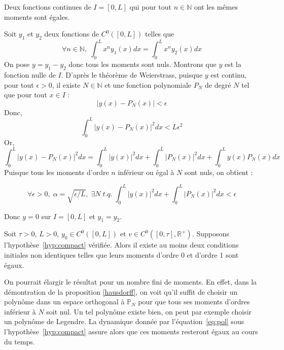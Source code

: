 \documentclass[a4paper]{article}
\begin{document}
\begin{proposition}
	\label{hausdorff}
	Deux fonctions continues de $I=[0,L]$ qui pour tout $n \in \mathbb{N}$ ont les mêmes moments sont égales. 
\end{proposition}

\begin{preuve}
	Soit $y_1$ et $y_2$ deux fonctions de $C^0([0,L])$ telles que 
	\[\forall n \in \mathbb{N}, \; \int_0^L x^n y_1(x)dx = \int_0^L x^n y_2(x)dx \]
	On pose $y=y_1 - y_2$ donc tous les moments sont nuls. Montrons que $y$ est la fonction nulle de $I$.
	D'après le théorème de Weierstrass, puisque $y$ est continu, pour tout $\epsilon>0$, il existe $N \in \mathbb{N}$ et une fonction polynomiale $P_N$ de degré $N$ tel que pour tout $x \in I$ :
	\[ |y(x) - P_N(x)| < \epsilon \]
	Donc,
	\[ \int_0^L |y(x) - P_N(x)|^2 dx < L \epsilon^2 \]
	Or,
	\[ \int_0^L |y(x) - P_N(x)|^2 dx = \int_0^L |y(x)|^2 dx  + \int_0^L |P_N(x)|^2 dx 
	                                   + \int_0^L y(x)P_N(x)dx \]
 Puisque tous les moments d'ordre $n$ inférieur ou égal à $N$ sont nuls, on obtient :
 
 \[ \forall \epsilon>0, \; \alpha = \sqrt{\epsilon/L}  , \; \exists N \; t.q. \; \int_0^L |y(x)|^2 dx  + \int_0^L |P_N(x)|^2 dx <\epsilon \]
 
 Donc $y =0$ sur $I=[0,L]$ et $y_1=y_2$.

\end{preuve}

\begin{proposition}
	Soit $\tau >0$, $L>0$, $y_0 \in C^0([0,L])$ et $v \in C^0([0,\tau],\mathbb{R}^+)$.
	Supposons l'hypothèse~\eqref{hyp:compact} vérifiée.
	Alors il existe au moins deux conditions initiales non identiques telles que leurs moments d'ordre 0 et d'ordre 1 sont égaux. 
\end{proposition}

\begin{remarque}
	On pourrait élargir le résultat pour un nombre fini de moments. En effet, dans la démontration de la proposition \ref{hausdorff}, on voit qu'il suffit de choisir un polynôme dans un espace orthogonal à $\mathbb{P}_N$ pour que tous ses moments d'ordres inférieur à $N$ soit nul. Un tel polynôme existe bien, on peut par exemple choisir un polynôme de Legendre. La dynamique donnée par l'équation~\eqref{eq:pol} sous l'hypothèse~\eqref{hyp:compact} assure alors que ces moments resteront égaux au cours du temps.
\end{remarque}
\end{document}
